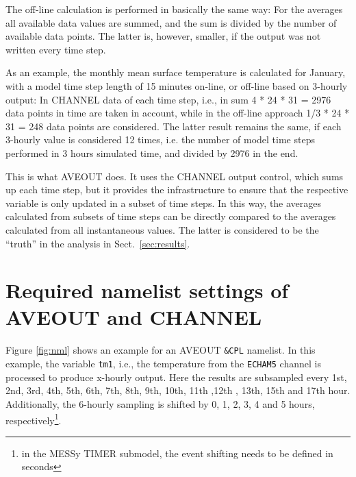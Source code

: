 \documentclass[twoside]{article}
\begin{document}
The off-line calculation is performed in basically the same way: For the
averages all available data values are summed, and the sum is
divided by the number of available data points.
The latter is, however, smaller, if the output was not written every time step.

As an example, the monthly mean surface temperature is calculated for
January, with a model time step length of 15 minutes on-line,
or off-line based on 3-hourly output:
%
In CHANNEL data of each time step, i.e., in sum 4 * 24 * 31 = 2976 data
points in time are taken in account, while in the off-line approach 1/3 * 24 *
31 = 248 data points are considered. The latter result remains the same,
if each 3-hourly value is considered 12 times, i.e.
the number of model time steps performed in 3 hours simulated time, and
divided by 2976 in the end. 

This is what AVEOUT does. It uses the CHANNEL output control, which sums up
each time step, but it provides the infrastructure to ensure that the
respective variable is only updated in a subset of time steps.
In this way, the averages calculated from subsets of time steps
can be directly compared to the averages calculated from all
instantaneous values. The latter is considered to be the ``truth'' in the
analysis in Sect.\ \ref{sec:results}.


\section{Required namelist settings of AVEOUT and CHANNEL}
\label{sec:namelists}

Figure \ref{fig:nml} shows an example for an AVEOUT \verb|&CPL| namelist. In
this example, the variable \verb|tm1|, i.e., the temperature from the
\verb|ECHAM5| channel is
processed to produce x-hourly output. Here the results are subsampled every
1st, 2nd, 3rd, 4th, 5th, 6th, 7th, 8th, 9th, 10th, 11th ,12th , 13th, 15th and
17th hour. Additionally, the 6-hourly sampling is shifted by
0, 1, 2, 3, 4 and 5 hours, respectively\footnote{in the MESSy TIMER submodel,
  the event shifting needs to be defined in seconds}.
\end{document}
